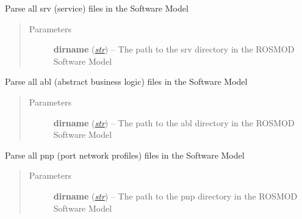 \documentclass[letterpaper,10pt,english]{sphinxmanual}
\begin{document}
\begin{fulllineitems}
\begin{fulllineitems}
\end{fulllineitems}


\begin{fulllineitems}
\label{class_Project:ROSMOD_Project.parse_srv}
Parse all srv (service) files in the Software Model
\begin{quote}\begin{description}
\item[{Parameters}] \leavevmode
\textbf{dirname} (\href{http://docs.python.org/library/functions.html\#str}{\emph{str}}) -- The path to the srv directory in the ROSMOD Software Model

\end{description}\end{quote}

\end{fulllineitems}


\begin{fulllineitems}
\label{class_Project:ROSMOD_Project.parse_abl}
Parse all abl (abstract business logic) files in the Software Model
\begin{quote}\begin{description}
\item[{Parameters}] \leavevmode
\textbf{dirname} (\href{http://docs.python.org/library/functions.html\#str}{\emph{str}}) -- The path to the abl directory in the ROSMOD Software Model

\end{description}\end{quote}

\end{fulllineitems}


\begin{fulllineitems}
\label{class_Project:ROSMOD_Project.parse_pnp}
Parse all pnp (port network profiles) files in the Software Model
\begin{quote}\begin{description}
\item[{Parameters}] \leavevmode
\textbf{dirname} (\href{http://docs.python.org/library/functions.html\#str}{\emph{str}}) -- The path to the pnp directory in the ROSMOD Software Model


\end{description}
\end{quote}
\end{fulllineitems}
\end{fulllineitems}
\end{document}
